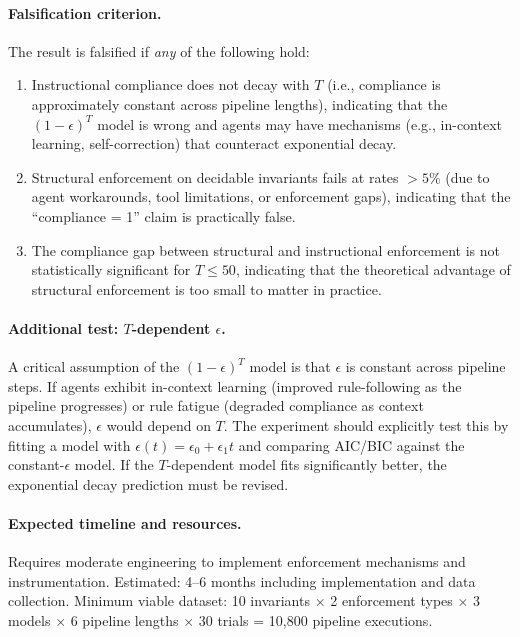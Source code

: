 \documentclass[11pt, a4paper, logo, copyright]{googledeepmind}
\begin{document}
\paragraph{Falsification criterion.} The result is falsified if \emph{any} of the following hold:
\begin{enumerate}[nosep]
    \item Instructional compliance does not decay with $T$ (i.e., compliance is approximately constant across pipeline lengths), indicating that the $(1-\epsilon)^T$ model is wrong and agents may have mechanisms (e.g., in-context learning, self-correction) that counteract exponential decay.
    \item Structural enforcement on decidable invariants fails at rates $> 5\%$ (due to agent workarounds, tool limitations, or enforcement gaps), indicating that the ``compliance = 1'' claim is practically false.
    \item The compliance gap between structural and instructional enforcement is not statistically significant for $T \leq 50$, indicating that the theoretical advantage of structural enforcement is too small to matter in practice.
\end{enumerate}

\paragraph{Additional test: $T$-dependent $\epsilon$.} A critical assumption of the $(1-\epsilon)^T$ model is that $\epsilon$ is constant across pipeline steps. If agents exhibit in-context learning (improved rule-following as the pipeline progresses) or rule fatigue (degraded compliance as context accumulates), $\epsilon$ would depend on $T$. The experiment should explicitly test this by fitting a model with $\epsilon(t) = \epsilon_0 + \epsilon_1 t$ and comparing AIC/BIC against the constant-$\epsilon$ model. If the $T$-dependent model fits significantly better, the exponential decay prediction must be revised.

\paragraph{Expected timeline and resources.} Requires moderate engineering to implement enforcement mechanisms and instrumentation. Estimated: 4--6 months including implementation and data collection. Minimum viable dataset: 10 invariants $\times$ 2 enforcement types $\times$ 3 models $\times$ 6 pipeline lengths $\times$ 30 trials = 10,800 pipeline executions.
\end{document}
